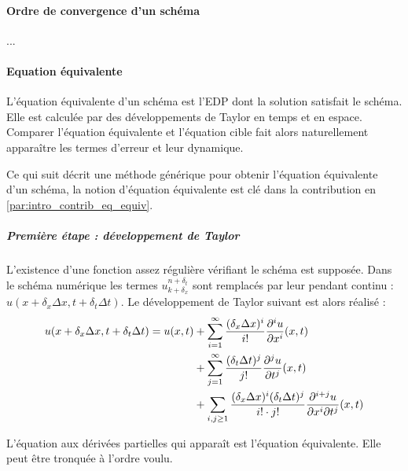         \paragraph{Ordre de convergence d'un schéma}
        \begin{definition}
            ...
        \end{definition}
        \paragraph{Equation équivalente}
        \begin{definition}
        L'équation équivalente d'un schéma est l'EDP dont la solution satisfait le schéma.
        Elle est calculée par des développements de Taylor en temps et en espace.
        Comparer l'équation équivalente et l'équation cible fait alors naturellement apparaître les termes d'erreur et leur dynamique.
        \end{definition}

        Ce qui suit décrit une méthode générique pour obtenir l'équation équivalente d'un schéma, la notion d'équation équivalente est clé dans la contribution en \ref{par:intro_contrib_eq_equiv}.

        \subparagraph{Première étape : développement de Taylor}

        L'existence d'une fonction assez régulière vérifiant le schéma est supposée.
        Dans le schéma numérique les termes $u^{n+\delta_t}_{k+\delta_x}$ sont remplacés par leur pendant
        continu : $u(x+\delta_x \Delta x, t + \delta_t \Delta t)$. Le développement de Taylor suivant est alors réalisé :
        \begin{align}
        u(x+\delta_x \Delta x, t + \delta_t \Delta t) = u(x,t)
        &+ \sum_{i=1}^{\infty} \frac{(\delta_x \Delta x)^i}{i!}
        \frac{\partial^i u}{\partial x^i}(x,t) \notag \\
        &+ \sum_{j=1}^{\infty} \frac{(\delta_t \Delta t)^j}{j!}
        \frac{\partial^j u}{\partial t^j}(x,t) \notag \\
        &+ \sum_{i,j \geq 1} \frac{(\delta_x \Delta x)^i (\delta_t \Delta t)^j}{i! \cdot j!}
        \frac{\partial^{i+j} u}{\partial x^i \partial t^j}(x,t)
        \end{align}

        L'équation aux dérivées partielles qui apparaît est l'équation équivalente. Elle peut être tronquée à l'ordre voulu.

